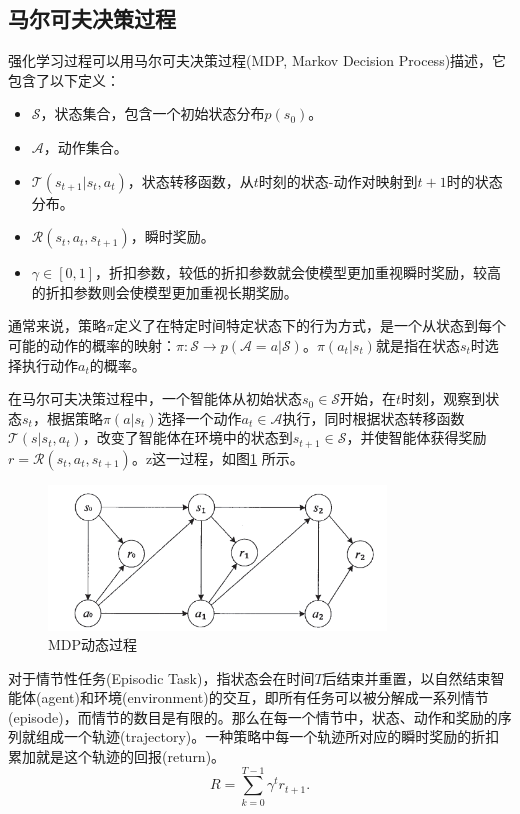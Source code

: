 \subsection{马尔可夫决策过程}
强化学习过程可以用马尔可夫决策过程(MDP, Markov Decision Process)描述，它包含了以下定义：
\begin{itemize}
  \item $\mathcal{S}$，状态集合，包含一个初始状态分布$p \left( s_0 \right)$。
  \item $\mathcal{A}$，动作集合。
  \item $\mathcal{T}(s_{t+1}|s_t,a_t)$，状态转移函数，从$t$时刻的状态-动作对映射到$t+1$时的状态分布。
  \item $\mathcal{R}(s_t, a_t, s_{t+1})$，瞬时奖励。
  \item $\gamma \in [0,1]$，折扣参数，较低的折扣参数就会使模型更加重视瞬时奖励，较高的折扣参数则会使模型更加重视长期奖励。
\end{itemize}

通常来说，策略$\pi$定义了在特定时间特定状态下的行为方式，是一个从状态到每个可能的动作的概率的映射：$\pi : \mathcal{S} \to p(\mathcal{A} = a | \mathcal{S})$。$\pi(a_t|s_t)$就是指在状态$s_t$时选择执行动作$a_t$的概率。

在马尔可夫决策过程中，一个智能体从初始状态$s_0 \in \mathcal{S}$开始，在$t$时刻，观察到状态$s_t$，根据策略$\pi(a|s_t)$选择一个动作$a_t \in \mathcal{A}$执行，同时根据状态转移函数$\mathcal{T}(s|s_t,a_t)$，改变了智能体在环境中的状态到$s_{t+1} \in \mathcal{S}$，并使智能体获得奖励$r = \mathcal{R}(s_t, a_t, s_{t+1})$。z这一过程，如图\ref{mdp} 所示。

\begin{figure}[htb]
  \centering
  \includegraphics[width=0.80\textwidth]{figures/mdp.png}
  \caption{MDP动态过程}\label{mdp}
\end{figure}

对于情节性任务(Episodic Task)，指状态会在时间$T$后结束并重置，以自然结束智能体(agent)和环境(environment)的交互，即所有任务可以被分解成一系列情节(episode)，而情节的数目是有限的。那么在每一个情节中，状态、动作和奖励的序列就组成一个轨迹(trajectory)。一种策略中每一个轨迹所对应的瞬时奖励的折扣累加就是这个轨迹的回报(return)。
\begin{equation}
R = \sum_{k=0}^{T-1} \gamma^t r_{t+1}.
\end{equation}

